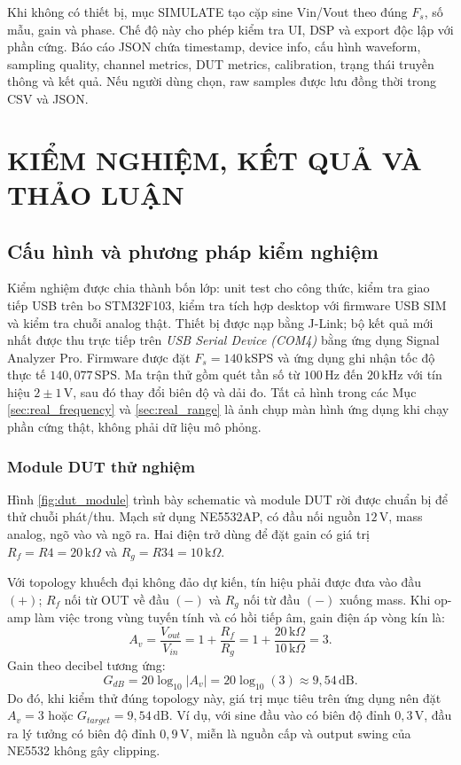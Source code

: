 \documentclass[12pt,a4paper]{report}
\newcommand{\unit}[1]{\,\mathrm{#1}}
\begin{document}
Khi không có thiết bị, mục SIMULATE tạo cặp sine Vin/Vout theo đúng $F_s$, số mẫu, gain và phase. Chế độ này cho phép kiểm tra UI, DSP và export độc lập với phần cứng. Báo cáo JSON chứa timestamp, device info, cấu hình waveform, sampling quality, channel metrics, DUT metrics, calibration, trạng thái truyền thông và kết quả. Nếu người dùng chọn, raw samples được lưu đồng thời trong CSV và JSON.

\chapter{KIỂM NGHIỆM, KẾT QUẢ VÀ THẢO LUẬN}

\section{Cấu hình và phương pháp kiểm nghiệm}
Kiểm nghiệm được chia thành bốn lớp: unit test cho công thức, kiểm tra giao tiếp USB trên bo STM32F103, kiểm tra tích hợp desktop với firmware USB SIM và kiểm tra chuỗi analog thật. Thiết bị được nạp bằng J-Link; bộ kết quả mới nhất được thu trực tiếp trên \textit{USB Serial Device (COM4)} bằng ứng dụng Signal Analyzer Pro. Firmware được đặt $F_s=140\unit{kSPS}$ và ứng dụng ghi nhận tốc độ thực tế $140{,}077\unit{SPS}$. Ma trận thử gồm quét tần số từ $100\unit{Hz}$ đến $20\unit{kHz}$ với tín hiệu $2\pm1\unit{V}$, sau đó thay đổi biên độ và dải đo. Tất cả hình trong các Mục \ref{sec:real_frequency} và \ref{sec:real_range} là ảnh chụp màn hình ứng dụng khi chạy phần cứng thật, không phải dữ liệu mô phỏng.

\subsection{Module DUT thử nghiệm}
Hình \ref{fig:dut_module} trình bày schematic và module DUT rời được chuẩn bị để thử chuỗi phát/thu. Mạch sử dụng NE5532AP, có đầu nối nguồn $12\unit{V}$, mass analog, ngõ vào và ngõ ra. Hai điện trở dùng để đặt gain có giá trị $R_f=R4=20\,\mathrm{k}\Omega$ và $R_g=R34=10\,\mathrm{k}\Omega$.

Với topology khuếch đại không đảo dự kiến, tín hiệu phải được đưa vào đầu $(+)$; $R_f$ nối từ OUT về đầu $(-)$ và $R_g$ nối từ đầu $(-)$ xuống mass. Khi op-amp làm việc trong vùng tuyến tính và có hồi tiếp âm, gain điện áp vòng kín là:
\begin{equation}
A_v=\frac{V_{out}}{V_{in}}=1+\frac{R_f}{R_g}
   =1+\frac{20\,\mathrm{k}\Omega}{10\,\mathrm{k}\Omega}=3.
\label{eq:dut_gain_linear}
\end{equation}
Gain theo decibel tương ứng:
\begin{equation}
G_{dB}=20\log_{10}|A_v|=20\log_{10}(3)\approx 9{,}54\unit{dB}.
\label{eq:dut_gain_db}
\end{equation}
Do đó, khi kiểm thử đúng topology này, giá trị mục tiêu trên ứng dụng nên đặt $A_v=3$ hoặc $G_{target}=9{,}54\unit{dB}$. Ví dụ, với sine đầu vào có biên độ đỉnh $0{,}3\unit{V}$, đầu ra lý tưởng có biên độ đỉnh $0{,}9\unit{V}$, miễn là nguồn cấp và output swing của NE5532 không gây clipping.
\end{document}
